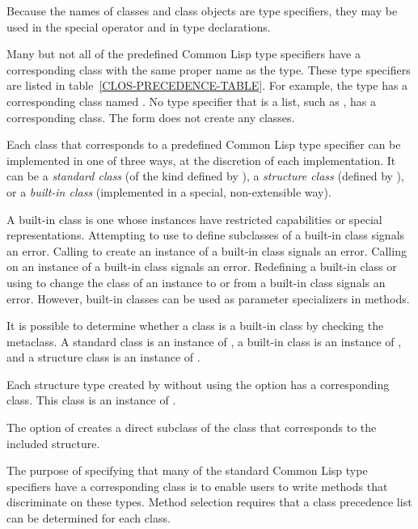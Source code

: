 Because the names of classes and class objects are type specifiers, they may
be used in the special operator  and in type declarations.

Many but not all of the predefined Common Lisp type specifiers have a
corresponding class with the same proper name as the type.  These type
specifiers are listed in table~\ref{CLOS-PRECEDENCE-TABLE}.  For example, the
type  has a corresponding class named .  No type specifier
that is a list, such as , has a corresponding
class. The form  does not create any classes.

Each class that corresponds to a predefined Common Lisp type specifier
can be implemented in one of three ways, at the discretion of each
implementation.  It can be a \emph{standard class} (of the kind
defined by ), a \emph{structure class} (defined
by ), or a \emph{built-in class} (implemented in
a special, non-extensible way).

A built-in class is one whose instances have restricted capabilities or
special representations.  Attempting to use  to define 
subclasses of a built-in class signals an error.  Calling 
 to create an instance of a built-in class signals an error.
Calling  on an instance of a built-in class signals an
error.  Redefining a built-in class or using  to change
the class of an instance to or from a built-in class signals an error.
However, built-in classes can be used as parameter specializers in
methods.

It is possible to determine whether a class is a built-in class by
checking the metaclass.  A standard class is an instance of 
, a built-in class is an instance of 
, and a structure class is an instance of 
.

Each structure type created by  without using the 
 option has a corresponding class.  This class is an instance of
.

The  option of  creates a direct
subclass of the class that corresponds to the included structure.

The purpose of specifying that many of the standard Common Lisp type
specifiers have a corresponding class is to enable users to write methods that
discriminate on these types.  
Method selection requires that a class precedence list can be
determined for each class.

